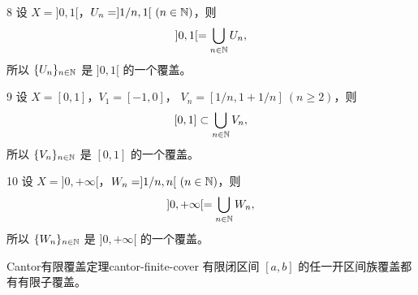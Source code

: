 \begin{sourceexample}{8}
设 \(X=]0,1[\)，\(U_n=]1/n,1[\ (n\in\mathbb{N})\)，则
\[
]0,1[=\bigcup_{n\in\mathbb{N}}U_n,
\]
所以 \(\{U_n\}_{n\in\mathbb{N}}\) 是 \(]0,1[\) 的一个覆盖。
\end{sourceexample}

\begin{sourceexample}{9}
设 \(X=[0,1]\)，\(V_1=[-1,0]\)，
\(V_n=[1/n,1+1/n]\ (n\geqslant2)\)，则
\[
[0,1]\subset\bigcup_{n\in\mathbb{N}}V_n,
\]
所以 \(\{V_n\}_{n\in\mathbb{N}}\) 是 \([0,1]\) 的一个覆盖。
\end{sourceexample}

\begin{sourceexample}{10}
设 \(X=]0,+\infty[\)，\(W_n=]1/n,n[\ (n\in\mathbb{N})\)，则
\[
]0,+\infty[=\bigcup_{n\in\mathbb{N}}W_n,
\]
所以 \(\{W_n\}_{n\in\mathbb{N}}\) 是 \(]0,+\infty[\) 的一个覆盖。
\end{sourceexample}

\begin{mythm}{Cantor有限覆盖定理}{cantor-finite-cover}
有限闭区间 \([a,b]\) 的任一开区间族覆盖都有有限子覆盖。
\end{mythm}

